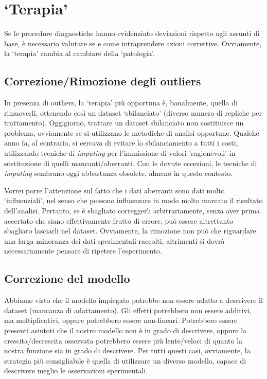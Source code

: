 \documentclass[a4paper,12pt,oneside]{book}
\begin{document}
\hypertarget{terapia}{%
\section{`Terapia'}\label{terapia}}

Se le procedure diagnostiche hanno evidenziato deviazioni rispetto agli assunti di base, è necessario valutare se e come intraprendere azioni correttive. Ovviamente, la `terapia' cambia al cambiare della `patologia'.

\hypertarget{correzionerimozione-degli-outliers}{%
\subsection{Correzione/Rimozione degli outliers}\label{correzionerimozione-degli-outliers}}

In presenza di outliers, la `terapia' più opportuna è, banalmente, quella di rimuoverli, ottenendo così un dataset `sbilanciato' (diverso numero di repliche per trattamento). Oggigiorno, trattare un dataset sbilanciato non costituisce un problema, ovviamente se si utilizzano le metodiche di analisi opportune. Qualche anno fa, al contrario, si cercava di evitare lo sbilanciamento a tutti i costi, utilizzando tecniche di \emph{imputing} per l'immissione di valori 'ragionevoli' in sostituzione di quelli mancanti/aberranti. Con le dovute eccezioni, le tecniche di \emph{imputing} sembrano oggi abbastanza obsolete, almeno in questo contesto.

Vorrei porre l'attenzione sul fatto che i dati aberranti sono dati molto `influenziali', nel senso che possono influenzare in modo molto marcato il risultato dell'analisi. Pertanto, se è sbagliato correggerli arbitrariamente, senza aver prima accertato che siano effettivamente frutto di errore, può essere altrettanto sbagliato lasciarli nel dataset. Ovviamente, la rimozione non può che riguardare una larga minoranza dei dati sperimentali raccolti, altrimenti si dovrà necessariamente pensare di ripetere l'esperimento.

\hypertarget{correzione-del-modello}{%
\subsection{Correzione del modello}\label{correzione-del-modello}}

Abbiamo visto che il modello impiegato potrebbe non essere adatto a descrivere il dataset (mancanza di adattamento). Gli effetti potrebbero non essere additivi, ma moltiplicativi, oppure potrebbero essere non-lineari. Potrebbero essere presenti asintoti che il nostro modello non è in grado di descrivere, oppure la crescita/decrescita osservata potrebbero essere più lente/veloci di quanto la nostra funzione sia in grado di descrivere. Per tutti questi casi, ovviamente, la strategia più consigliabile è quella di utilizzare un diverso modello, capace di descrivere meglio le osservazioni sperimentali.
\end{document}
